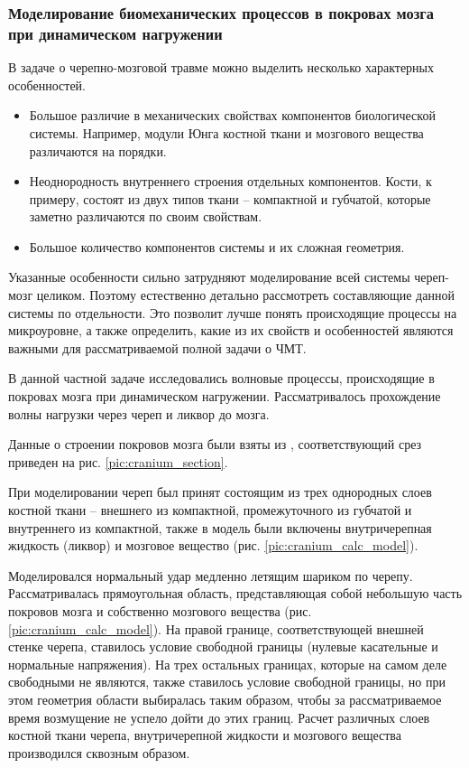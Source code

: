\clearpage
\newpage

\subsubsection{Моделирование биомеханических процессов в покровах мозга при динамическом нагружении}

В задаче о черепно-мозговой травме можно выделить несколько характерных особенностей.

\begin{itemize}

\item Большое различие в механических свойствах компонентов биологической системы. Например, модули Юнга костной ткани и мозгового вещества различаются на порядки.

\item Неоднородность внутреннего строения отдельных компонентов. Кости, к примеру, состоят из двух типов ткани -- компактной и губчатой, которые заметно различаются по своим свойствам.

\item Большое количество компонентов системы и их сложная геометрия.

\end{itemize}

Указанные особенности сильно затрудняют моделирование всей системы череп-мозг целиком. Поэтому естественно детально рассмотреть составляющие данной системы по отдельности. Это позволит лучше понять происходящие процессы на микроуровне, а также определить, какие из их свойств и особенностей являются важными для рассматриваемой полной задачи о ЧМТ.

В данной частной задаче исследовались волновые процессы, происходящие в покровах мозга при динамическом нагружении. Рассматривалось прохождение волны нагрузки через череп и ликвор до мозга. 

Данные о строении покровов мозга были взяты из \cite{anatomy_atlas}, соответствующий срез приведен на рис. \ref{pic:cranium_section}.

При моделировании череп был принят состоящим из трех однородных слоев костной ткани – внешнего из компактной, промежуточного из губчатой и внутреннего из компактной, также в модель были включены внутричерепная жидкость (ликвор) и мозговое вещество (рис. \ref{pic:cranium_calc_model}).

Моделировался нормальный удар медленно летящим шариком по черепу. Рассматривалась прямоугольная область, представляющая собой небольшую часть покровов мозга и собственно мозгового вещества (рис. \ref{pic:cranium_calc_model}). На правой границе, соответствующей внешней стенке черепа, ставилось условие свободной границы (нулевые касательные и нормальные напряжения). На трех остальных границах, которые на самом деле свободными не являются, также ставилось условие свободной границы, но при этом геометрия области выбиралась таким образом, чтобы за рассматриваемое время возмущение не успело дойти до этих границ. Расчет различных слоев костной ткани черепа, внутричерепной жидкости и мозгового вещества производился сквозным образом.

